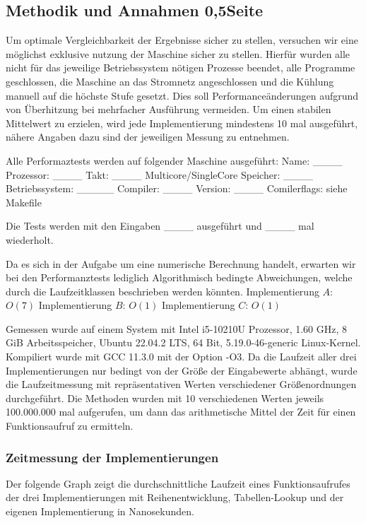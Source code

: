 \documentclass[course=erap] {aspdoc}
\begin{document}
    \subsection{Methodik und Annahmen 0,5Seite}
    Um optimale Vergleichbarkeit der Ergebnisse sicher zu stellen, versuchen wir eine möglichst exklusive nutzung der Maschine sicher zu stellen.
    Hierfür wurden alle nicht für das jeweilige Betriebssystem nötigen Prozesse beendet, alle Programme geschlossen, die Maschine an das Stromnetz angeschlossen und die Kühlung manuell auf die höchste Stufe gesetzt.
    Dies soll Performanceänderungen aufgrund von Überhitzung bei mehrfacher Ausführung vermeiden.
    Um einen stabilen Mittelwert zu erzielen, wird jede Implementierung mindestens 10 mal ausgeführt, nähere Angaben dazu sind der jeweiligen Messung zu entnehmen.

    Alle Performaztests werden auf folgender Maschine ausgeführt: Name: ____ Prozessor: ____ Takt: ____ Multicore/SingleCore Speicher: ____ Betriebssystem: _____ Compiler: ____ Version: ____ Comilerflags: siehe Makefile

    Die Tests werden mit den Eingaben ____ ausgeführt und ____ mal wiederholt.

    Da es sich in der Aufgabe um eine numerische Berechnung handelt, erwarten wir bei den Performanztests lediglich Algorithmisch bedingte Abweichungen, welche durch die Laufzeitklassen beschrieben werden könnten.
    Implementierung $A$: $O(7)$
    Implementierung $B$: $O(1)$
    Implementierung $C$: $O(1)$


    Gemessen wurde auf einem System mit Intel i5-10210U Prozessor, 1.60 GHz, 8 GiB Arbeitsspeicher, Ubuntu 22.04.2 LTS, 64 Bit, 5.19.0-46-generic Linux-Kernel.
    Kompiliert wurde mit GCC 11.3.0 mit der Option -O3.
    Da die Laufzeit aller drei Implementierungen nur bedingt von der Größe der Eingabewerte abhängt,
    wurde die Laufzeitmessung mit repräsentativen Werten verschiedener Größenordnungen durchgeführt.
    Die Methoden wurden mit 10 verschiedenen Werten jeweils 100.000.000 mal aufgerufen, um dann das arithmetische Mittel der Zeit für einen Funktionsaufruf zu ermitteln.

    \subsubsection{Zeitmessung der Implementierungen}

    Der folgende Graph zeigt die durchschnittliche Laufzeit eines Funktionsaufrufes der drei Implementierungen mit Reihenentwicklung, Tabellen-Lookup und der eigenen Implementierung in Nanosekunden.
\end{document}
